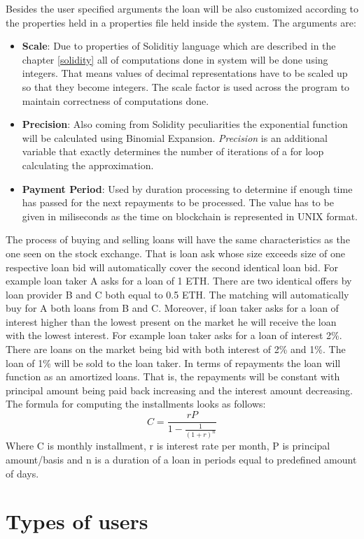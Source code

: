 \documentclass[a4paper,12pt,twoside,openany]{report}
\begin{document}
Besides the user specified arguments the loan will be also customized according to the properties held in a properties file held inside the system. The arguments are:
\begin{itemize}
\item \textbf{Scale}: Due to properties of Soliditiy language which are described in the chapter \ref{solidity} all of computations done in system will be done using integers. That means values of decimal representations have to be scaled up so that they become integers. The scale factor is used across the program to maintain correctness of computations done.
\item \textbf{Precision}: Also coming from Solidity peculiarities the exponential function will be calculated using Binomial Expansion. \textit{Precision} is an additional variable that exactly determines the number of iterations of a for loop calculating the approximation.
\item \textbf{Payment Period}: Used by duration processing to determine if enough time has passed for the next repayments to be processed. The value has to be given in miliseconds as the time on blockchain is represented in UNIX format.
\end{itemize}

The process of buying and selling loans will have the same characteristics as the one seen on the stock exchange. That is loan ask whose size exceeds size of one respective loan bid will automatically cover the second identical loan bid. For example loan taker A asks for a loan of 1 ETH. There are two identical offers by loan provider B and C both equal to 0.5 ETH. The matching will automatically buy for A both loans from B and C. Moreover, if loan taker asks for a loan of interest higher than the lowest present on the market he will receive the loan with the lowest interest. For example loan taker asks for a loan of interest 2\%. There are loans on the market being bid with both interest of 2\% and 1\%. The loan of 1\% will be sold to the loan taker. In terms of repayments the loan will function as an amortized loans. That is, the repayments will be constant with principal amount being paid back increasing and the interest amount decreasing. The formula for computing the installments looks as follows:
\[C = \frac{rP}{1 - \frac{1}{(1+r)^n}}\]
Where C is monthly installment, r is interest rate per month, P is principal amount/basis and n is a duration of a loan in periods equal to predefined amount of days.

\section{Types of users} \label{users}
\end{document}
